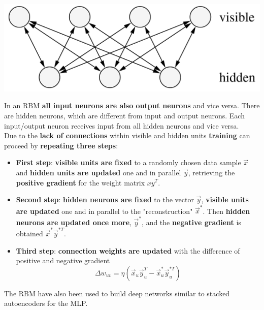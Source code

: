 \documentclass[11pt]{article}
\begin{document}
		\begin{center}
			\includegraphics[width=0.65\linewidth]{img/NN/RBM1}
		\end{center}
		
		In an RBM \textbf{all input neurons are also output neurons} and vice versa. There are hidden neurons, which are different from input and output neurons. Each input/output neuron receives input from all hidden neurons and vice versa.\\
		
		Due to the \textbf{lack of connections} within visible and hidden units \textbf{training} can proceed by \textbf{repeating three steps}: 
		\begin{itemize}
			\item \textbf{First step}: \textbf{visible units are fixed} to a randomly chosen data sample $\vec{x}$ and \textbf{hidden units are updated} one and in parallel $\vec{y}$, retrieving the \textbf{positive gradient} for the weight matrix $xy^T$.\\
			
			\item \textbf{Second step}: \textbf{hidden neurons are fixed} to the vector $\vec{y}$, \textbf{visible units are updated} one and in parallel to the "reconstruction" $\vec{x}^\ast$. Then \textbf{hidden neurons are updated once more}, $\vec{y}^\ast$, and the \textbf{negative gradient} is obtained $\vec{x}^\ast \vec{y}^{\ast T}$.\\
			
			\item \textbf{Third step}: \textbf{connection weights are updated} with the difference of positive and negative gradient
			$$ \Delta w_{uv} = \eta \left( \vec{x}_u \vec{y}_u^T - \vec{x}^\ast_u \vec{y}^{\ast T}_u \right)$$
		\end{itemize}
		
		The RBM have also been used to build deep networks similar to stacked autoencoders for the MLP.\\
		
		
		
		
		
	
\end{document}
